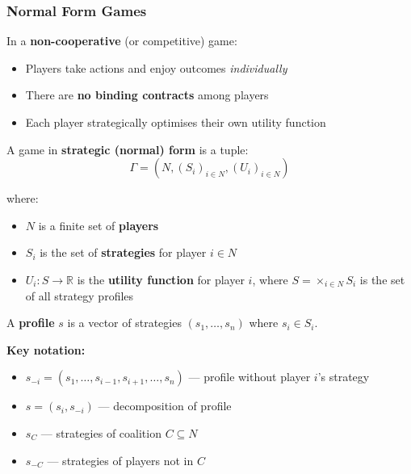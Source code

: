 \separator

\subsubsection{Normal Form Games}

\begin{defbox}
In a \textbf{non-cooperative} (or competitive) game:
\begin{itemize}
  \item Players take actions and enjoy outcomes \textit{individually}
  \item There are \textbf{no binding contracts} among players
  \item Each player strategically optimises their own utility function
\end{itemize}
\end{defbox}

\begin{defbox}
A game in \textbf{strategic (normal) form} is a tuple:
\[
\Gamma = (N, (S_i)_{i \in N}, (U_i)_{i \in N})
\]

where:
\begin{itemize}
  \item $N$ is a finite set of \textbf{players}
  \item $S_i$ is the set of \textbf{strategies} for player $i \in N$
  \item $U_i : S \to \mathbb{R}$ is the \textbf{utility function} for player $i$, where $S = \times_{i \in N} S_i$ is the set of all strategy profiles
\end{itemize}
\end{defbox}

\begin{defbox}
A \textbf{profile} $s$ is a vector of strategies $(s_1, \ldots, s_n)$ where $s_i \in S_i$.

\textbf{Key notation:}
\begin{itemize}
  \item $s_{-i} = (s_1, \ldots, s_{i-1}, s_{i+1}, \ldots, s_n)$ --- profile without player $i$'s strategy
  \item $s = (s_i, s_{-i})$ --- decomposition of profile
  \item $s_C$ --- strategies of coalition $C \subseteq N$
  \item $s_{-C}$ --- strategies of players not in $C$
\end{itemize}
\end{defbox}

